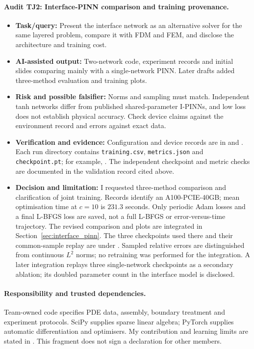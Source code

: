 \paragraph{Audit TJ2: Interface-PINN comparison and training provenance.}
\begin{itemize}[leftmargin=1.5em,itemsep=2pt]
    \item \textbf{Task/query:} Present the interface network as an
    alternative solver for the same layered problem, compare it with FDM
    and FEM, and disclose the architecture and training cost.
    \item \textbf{AI-assisted output:} Two-network code, experiment records
    and initial slides comparing mainly with a single-network PINN. Later
    drafts added three-method evaluation and training plots.
    \item \textbf{Risk and possible falsifier:} Norms and sampling must match.
    Independent tanh networks differ from published shared-parameter
    I-PINNs, and low loss does not establish physical accuracy. Check device
    claims against the environment record and errors against exact data.
    \item \textbf{Verification and evidence:} Configuration and device
    records are in
     and
    .
    Each run directory contains \texttt{training.csv},
    \texttt{metrics.json} and \texttt{checkpoint.pt}; for example,
    .
    The independent checkpoint and metric checks are documented in the
    validation record cited above.
    \item \textbf{Decision and limitation:} I requested three-method
    comparison and clarification of joint training. Records identify an
    A100-PCIE-40GB; mean optimisation time at $c=10$ is $231.3$ seconds.
    Only periodic Adam losses and a final L-BFGS loss are saved, not a full
    L-BFGS or error-versus-time trajectory. The revised comparison and plots
    are integrated in Section~\ref{sec:interface_pinn}. The three checkpoints
    used there and their common-sample replay are under
    . Sampled relative
    errors are distinguished from continuous $L^2$ norms; no retraining
    was performed for the integration. A later integration replays three
    single-network checkpoints as a secondary ablation; its doubled
    parameter count in the interface model is disclosed.
\end{itemize}

\paragraph{Responsibility and trusted dependencies.}
Team-owned code specifies PDE data, assembly, boundary treatment and
experiment protocols. SciPy supplies sparse linear algebra; PyTorch supplies
automatic differentiation and optimisers. My contribution and learning
limits are stated in . This fragment does not sign a
declaration for other members.
